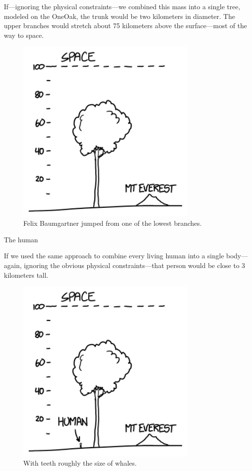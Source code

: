 {{If—ignoring the physical constraints—we combined this mass into a single tree, modeled on the OneOak, the trunk would be two kilometers in diameter. The upper branches would stretch about 75 kilometers above the surface—most of the way to space.}

\begin{figure}[!htbp]
\centering
\includegraphics[scale=0.5, max width=0.8\textwidth]{imgs/a/90/ygg_tree.png}
\caption{Felix Baumgartner jumped from one of the lowest branches.}
\end{figure}

{The human}

{If we used the same approach to combine every living human into a single body—again, ignoring the obvious physical constraints—that person would be close to 3 kilometers tall.}

\begin{figure}[!htbp]
\centering
\includegraphics[scale=0.5, max width=0.8\textwidth]{imgs/a/90/ygg_human.png}
\caption{With teeth roughly the size of whales.}
\end{figure}

}
